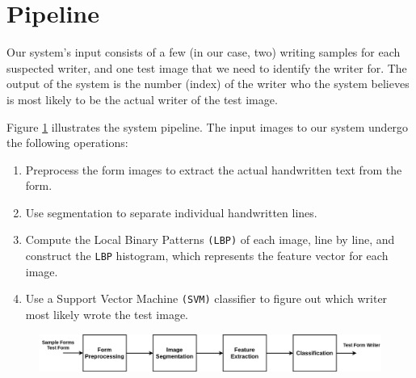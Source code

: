 \section{Pipeline}
Our system's input consists of a few (in our case, two) writing samples for each suspected writer, and one test image that we need to identify the writer for. The output of the system is the number (index) of the writer who the system believes is most likely to be the actual writer of the test image.

Figure \ref{fig:pipeline} illustrates the system pipeline. The input images to our system undergo the following operations:
\begin{enumerate}
    \item Preprocess the form images to extract the actual handwritten text from the form.
    \item Use segmentation to separate individual handwritten lines.
    \item Compute the Local Binary Patterns \texttt{(LBP)} of each image, line by line, and construct the \texttt{LBP} histogram, which represents the feature vector for each image.
    \item Use a Support Vector Machine \texttt{(SVM)} classifier to figure out which writer most likely wrote the test image.
\end{enumerate}

\begin{figure}[]
    \centering
    \includegraphics[width=\textwidth]{../figures/pipeline-diagram.png}
    \label{fig:pipeline}
\end{figure}


